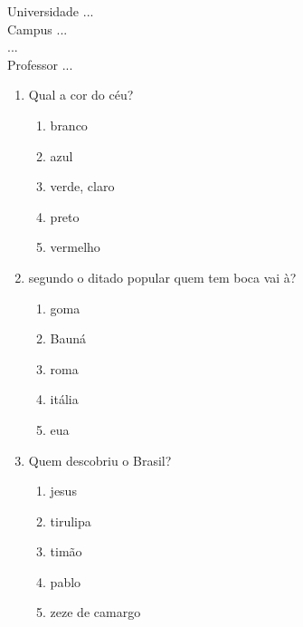 \documentclass[10pt,a4paper,twocolumn]{report}
\begin{document}
\begin{flushleft}
Universidade ...\\
Campus ...\\
...\\
Professor ...\\
\end{flushleft}




 \begin{enumerate} 
    \item  Qual a cor do céu?





    \begin{enumerate}
    \item  branco

\item  azul

\item  verde, claro

\item  preto

\item  vermelho


    \end{enumerate} 
    \item  segundo o ditado popular quem tem boca vai à?





    \begin{enumerate}
    \item  goma

\item  Bauná

\item  roma

\item  itália

\item  eua


    \end{enumerate} 
    \item  Quem descobriu o Brasil?





    \begin{enumerate}
    \item  jesus

\item  tirulipa

\item  timão

\item  pablo

\item  zeze de camargo


    \end{enumerate}\end{enumerate} 
\end{document}
